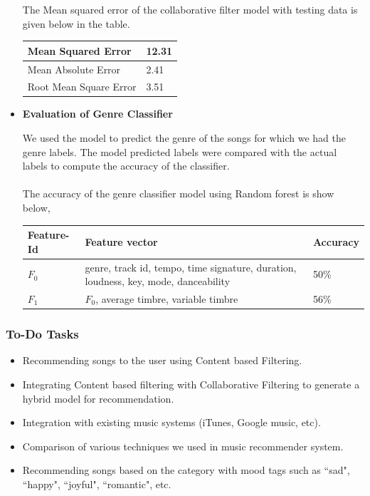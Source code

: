 \documentclass{sig-alternate-05-2015}
\begin{document}
\begin{itemize}
The Mean squared error of the collaborative filter model with testing data is given below in the table.
\begin{center}
\begin{tabular} { |p{4.4cm}|p{2cm}| } 
\hline Mean Squared Error & 12.31 \\
\hline Mean Absolute Error & 2.41 \\
\hline Root Mean Square Error & 3.51 \\
\hline
\end{tabular}
\end{center}
    
    \item \textbf{Evaluation of Genre Classifier}
    
    We used the model to predict the genre of the songs for which we had the genre labels. The model predicted labels were compared with the actual labels to compute the accuracy of the classifier.\\\\
    The accuracy of the genre classifier model using Random forest is show below,

\begin{center}
\begin{tabular} { |p{2cm}|p{3cm}|p{1.5cm}| } 
\hline \textbf{Feature-Id} & \textbf{Feature vector} &\textbf{Accuracy} \\
\hline $F_0$ & genre, track id, tempo, time signature, duration, loudness, key, mode, danceability & 50\% \\
\hline $F_1$ & $F_0$, average timbre, variable timbre & 56\% \\
\hline
\end{tabular}
\end{center}
\end{itemize}

\subsubsection{To-Do Tasks}
\begin{itemize}
    \item Recommending songs to the user using Content based Filtering.
    \item Integrating Content based filtering with Collaborative Filtering to generate a hybrid model for recommendation.
    \item Integration with existing music systems (iTunes, Google music, etc).
    \item Comparison of various techniques we used in music recommender system.
    \item Recommending songs based on the category with mood tags such as ``sad", ``happy", ``joyful", ``romantic", etc.\\
\end{itemize}
\end{document}
